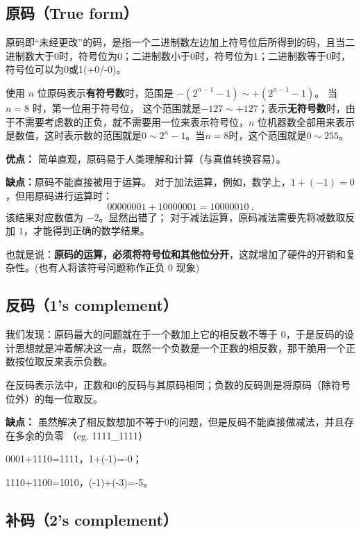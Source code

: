 
\subsection{原码（True form）}

原码即“未经更改”的码，是指一个二进制数左边加上符号位后所得到的码，且当二进制数大于0时，符号位为0；二进制数小于0时，符号位为1；二进制数等于0时，符号位可以为0或1(+0/-0)。

使用 $n$ 位原码表示\textbf{有符号数}时，范围是 $-(2^{n-1}-1)\sim +(2^{n-1}-1)$。 当 $n=8$ 时，第一位用于符号位， 这个范围就是$-127\sim +127 $；表示\textbf{无符号数}时，由于不需要考虑数的正负，就不需要用一位来表示符号位，$n$ 位机器数全部用来表示是数值，这时表示数的范围就是$0\sim 2^{n}-1$。当$n=8$时，这个范围就是$0\sim 255$。


\textbf{优点：}
简单直观，原码易于人类理解和计算（与真值转换容易）。

\textbf{缺点：}原码不能直接被用于运算。
对于加法运算，例如，数学上，$1+(-1)=0$，但用原码进行运算时：
\begin{equation}
00000001+10000001=10000010~.
\end{equation}
该结果对应数值为 $-2$。显然出错了；
对于减法运算，原码减法需要先将减数取反加 $1$，才能得到正确的数学结果。

也就是说：\textbf{原码的运算，必须将符号位和其他位分开}，这就增加了硬件的开销和复杂性。(也有人将该符号问题称作正负 $0$ 现象)

\subsection{反码（1's complement）}
我们发现：原码最大的问题就在于一个数加上它的相反数不等于 0，于是反码的设计思想就是冲着解决这一点，既然一个负数是一个正数的相反数，那干脆用一个正数按位取反来表示负数。

在反码表示法中，正数和0的反码与其原码相同；负数的反码则是将原码（除符号位外）的每一位取反。

\textbf{缺点：}
虽然解决了相反数想加不等于0的问题，但是反码不能直接做减法，并且存在多余的负零 （eg. 1111_1111）

\begin{example}{}
0001+1110=1111，1+(-1)=-0；

1110+1100=1010，(-1)+(-3)=-5。
\end{example}

\subsection{补码（2's complement）}

